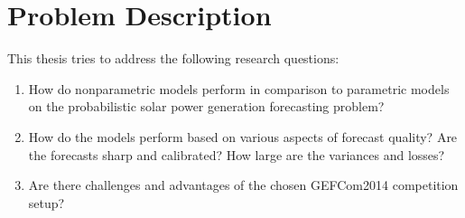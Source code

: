 \section{Problem Description}
\label{sec:problem-description}

This thesis tries to address the following research questions:
\begin{enumerate}
    \item How do nonparametric models perform in comparison to parametric models 
    on the probabilistic solar power generation forecasting problem?
    \item How do the models perform based on various aspects of forecast 
    quality? Are the forecasts sharp and calibrated? How large are the variances and losses?
    \item Are there challenges and advantages of the chosen GEFCom2014 competition setup?
\end{enumerate}